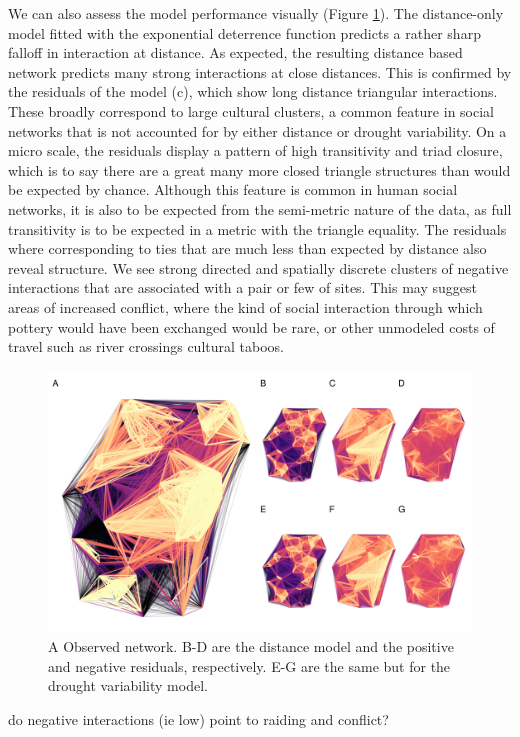 \documentclass[fleqn,10pt]{wlscirep}
\begin{document}
We can also assess the model performance visually (Figure \ref{fig:residuals}). The distance-only model fitted with the exponential deterrence function predicts a rather sharp falloff in interaction at distance. As expected, the resulting distance based network predicts many strong interactions at close distances. This is confirmed by the residuals of the model (c), which show long distance triangular interactions. These broadly correspond to large cultural clusters, a common feature in social networks that is not accounted for by either distance or drought variability. On a micro scale, the residuals display a pattern of high transitivity and triad closure, which is to say there are a great many more closed triangle structures than would be expected by chance. Although this feature is common in human social networks, it is also to be expected from the semi-metric nature of the data, as full transitivity is to be expected in a metric with the triangle equality. The residuals where corresponding to ties that are much less than expected by distance also reveal structure. We see strong directed and spatially discrete clusters of negative interactions that are associated with a pair or few of sites. This may suggest areas of increased conflict, where the kind of social interaction through which pottery would have been exchanged would be rare, or other unmodeled costs of travel such as river crossings cultural taboos. 

\begin{figure}[ht]
\centering
\includegraphics[width=.8\linewidth]{figures/null_model.png}
\caption{A Observed network. B-D are the distance model and the positive and negative residuals, respectively. E-G are the same but for the drought variability model.}
\label{fig:residuals}
\end{figure}


do negative interactions (ie low) point to raiding and conflict?
\end{document}
